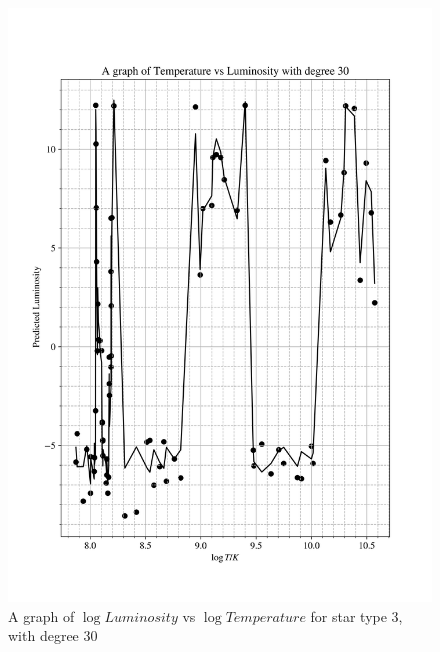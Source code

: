 \documentclass[12pt, a4paper]{article}
\begin{document}
\begin{figure}[H]
    \centering
    \includegraphics[width = \textwidth]{2Plot4_30.png}
    \caption{A graph of \(\log{Luminosity}\) vs \(\log{Temperature}\) for star type 3, with degree 30}
\end{figure}
\end{document}
